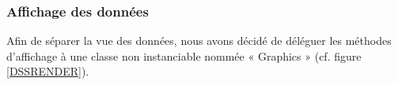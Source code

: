 \subsubsection{Affichage des données}

Afin de séparer la vue des données, nous avons décidé de déléguer les méthodes d'affichage à une classe non instanciable nommée « Graphics » (cf. figure \ref{DSSRENDER}).

